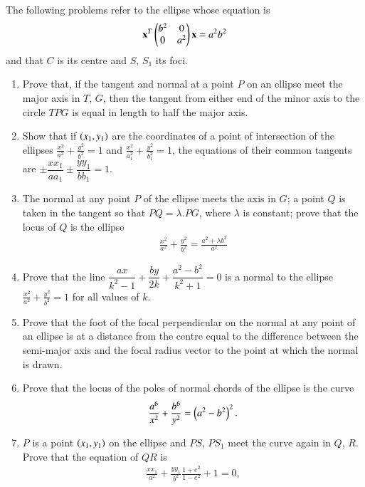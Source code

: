 \renewcommand{\theequation}{\theenumi}
The following problems refer to the ellipse whose 
equation is
\begin{align*}
\mathbf{x}^T\begin{pmatrix}b^2 & 0\\0 & a^2\end{pmatrix}\mathbf{x} =a^2b^2
\end{align*}
and that $C$ is its centre and $S$, $S_1$ its foci.
\begin{enumerate}[label=\arabic*.,ref=\thesubsection.\theenumi]
\item Prove that, if the tangent and normal at a point $P$ on an ellipse meet the major axis
in $T$, $G$, then the tangent from either end of the minor axis to the circle $TPG$ is equal in length to half the major
axis.
\item Show that if $\left(x_1,y_1\right)$ are the coordinates of a point of intersection of the ellipses $\frac{x^2}{a^2}+\frac{y^2}{b^2}=1$ and $\frac{x^2}{a_1^2}+\frac{y^2}{b_1^2}=1$, the equations of their common tangents are $\pm \dfrac{xx_1}{aa_1}\pm \dfrac{yy_1}{bb_1}=1$.
\item The normal at any point $P$ of the ellipse meets the axis in $G$; a point $Q$ is taken in the
tangent so that $PQ=\lambda.PG$, where $\lambda$ is constant; prove that the locus of $Q$ is the ellipse
\begin{align*}
\frac{x^2}{a^2}+\frac{y^2}{b^2}=\frac{a^2+\lambda b^2}{a^2}
\end{align*}
\item Prove that the line $\dfrac{ax}{k^2-1}+\dfrac{by}{2k}+\dfrac{a^2-b^2}{k^2+1} = 0$ is a normal to the ellipse 
$\frac{x^2}{a^2}+\frac{y^2}{b^2}=1$ for all values of $k$.
\item Prove that the foot of the focal perpendicular on the normal at any point of an ellipse is at
a distance from the centre equal to the difference between the semi-major axis and the focal
radius vector to the point at which the normal is drawn.
\item Prove that the locus of the poles of normal chords of the ellipse is the curve
\begin{align*}
\frac{a^6}{x^2}+\frac{b^6}{y^2}=\left(a^2-b^2\right)^2.
\end{align*}
\item $P$ is a point $\left(x_1,y_1\right)$ on the ellipse and $PS$, $PS_1$ meet the curve again in $Q$, $R$.  Prove that
the equation of $QR$ is 
\begin{align*}
\frac{xx_1}{a^2}+\frac{yy_1}{b^2}\frac{1+e^2}{1-e^2} + 1 = 0,
\end{align*}

\end{enumerate}
